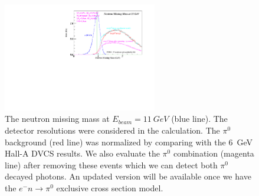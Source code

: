 \documentclass[a4paper,10.5pt]{article}
\begin{document}
 \begin{figure}[!ht]
 \begin{center}
  \includegraphics[width=0.6\textwidth]{./figures/neutron_DVCS_pi0_MM.pdf}
  \caption[The neutron missing mass at $E_{beam}=11~GeV$]{\footnotesize{The neutron missing mass at $E_{beam}=11~GeV$ (blue line). The detector resolutions were considered in the calculation. The $\pi^{0}$ background (red line) was normalized by comparing with the 6~GeV Hall-A DVCS results. We also evaluate the $\pi^{0}$ combination (magenta line) after removing these events which we can detect both $\pi^{0}$ decayed photons. An updated version will be available once we have the $e^{-}n\rightarrow\pi^{0}$ exclusive cross section model.}}
  \label{mm_11}
 \end{center}
\end{figure}
\end{document}
